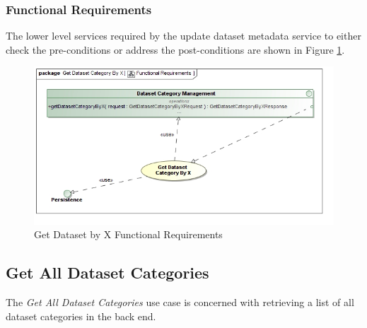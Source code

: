 \subsubsection{Functional Requirements}
The lower level services required by the update dataset metadata service to
either check the pre-conditions or address the post-conditions are shown in 
Figure \ref{fig:getDatasetCategoryByXFunctionalRequirements}.
\begin{figure}[H]
  \begin{center}
  \includegraphics[scale=0.38]{../Diagrams and Charts/Repository Management/Get Dataset Category By X Functional Requirements.jpg}
  \caption{Get Dataset by X Functional Requirements}
  \label{fig:getDatasetCategoryByXFunctionalRequirements}
  \end{center}
\end{figure}



\subsection {Get All Dataset Categories}
The \textit{Get All Dataset Categories} use case is concerned with retrieving a
list of all dataset categories in the back end.

